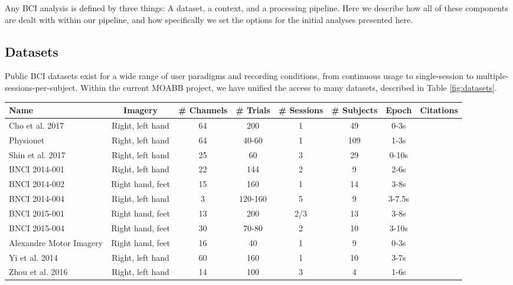Any BCI analysis is defined by three things: A dataset, a context, and
a processing pipeline. Here we describe how all of these components
are dealt with within our pipeline, and how specifically we set the
options for the initial analyses presented here.

\subsection{Datasets}

Public BCI datasets exist for a wide range of user paradigms and
recording conditions, from continuous usage to single-session to
multiple-sessions-per-subject. Within the current MOABB project, we
have unified the access to many datasets, described in Table
\ref{fig:datasets}.


\begin{table*}[ht]
  \centering
  \begin{tabular}{l || c | c | c | c | c | c | c }
    Name & Imagery & \# Channels & \# Trials & \# Sessions & \# Subjects & Epoch & Citations \\ \hline
    Cho et al. 2017 & Right, left hand & 64 & 200 & 1 & 49 & 0-3s & \cite{Cho2017} \\
    Physionet & Right, left hand & 64 & 40-60 & 1 & 109 & 1-3s & \cite{Schalk2004, Goldberger2000} \\
    Shin et al. 2017 & Right, left hand & 25 & 60 & 3 & 29 & 0-10s & \cite{Blankertz2007, Shin2017} \\
    BNCI 2014-001 & Right, left hand & 22 & 144 & 2 & 9 & 2-6s & \cite{Tangermann2012} \\
    BNCI 2014-002 & Right hand, feet & 15 & 160 & 1 & 14 & 3-8s & \cite{Steyrl2016a} \\
    BNCI 2014-004 & Right, left hand & 3 & 120-160 & 5 & 9 & 3-7.5s & \cite{Leeb2007} \\
    BNCI 2015-001 & Right hand, feet & 13 & 200 & 2/3 & 13 & 3-8s & \cite{Faller2012} \\
    BNCI 2015-004 & Right hand, feet & 30 & 70-80 & 2 & 10 & 3-10s & \cite{Scherer2015} \\
    Alexandre Motor Imagery & Right hand, feet & 16 & 40 & 1 & 9 & 0-3s & \cite{Barachant2012a}\\
    Yi et al. 2014 & Right, left hand & 60 & 160 & 1 & 10 & 3-7s & \cite{Yi2014} \\
    Zhou et al. 2016 & Right, left hand & 14 & 100 & 3 & 4 & 1-6s & \cite{Zhou2016a}\\
    
\end{tabular}
    \caption{Dataset attributes}
    \label{fig:datasets}
\end{table*}

